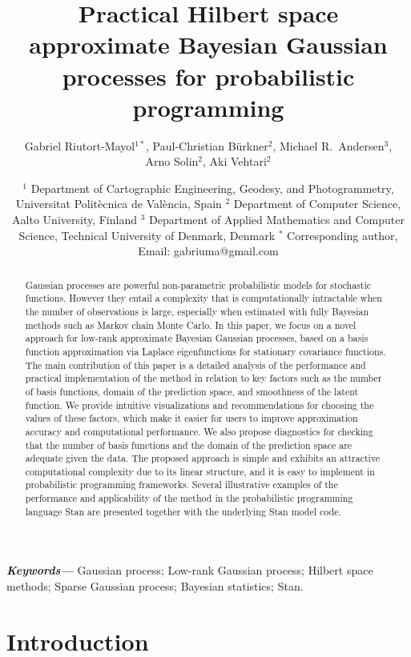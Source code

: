 \documentclass[onecolumn,a4paper,11pt]{article}
\title{Practical Hilbert space approximate Bayesian Gaussian processes for probabilistic programming}
\author{Gabriel Riutort-Mayol$^{1*}$, Paul-Christian Bürkner$^2$, Michael R.\ Andersen$^{3}$,\\
  Arno Solin$^{2}$, Aki Vehtari$^{2}$}
\date{ \small
$^1$ Department of Cartographic Engineering, Geodesy, and Photogrammetry, Universitat Polit\`ecnica de Val\`encia, Spain 
\break
$^2$ Department of Computer Science, Aalto University, Finland
\break
$^3$ Department of Applied Mathematics and Computer Science, Technical University of Denmark, Denmark
\break
$^*$ Corresponding author, Email: gabriuma@gmail.com
}
\providecommand{\keywords}[1]
{
  \small	
  \textbf{\textit{Keywords---}} #1
}
\begin{document}
\maketitle

\begin{abstract}
Gaussian processes are powerful non-parametric probabilistic models for stochastic functions. However they entail a complexity that is computationally intractable when the number of observations is large, especially when estimated with fully Bayesian methods such as Markov chain Monte Carlo. In this paper, we focus on a novel approach for low-rank approximate Bayesian Gaussian processes, based on a basis function approximation via Laplace eigenfunctions for stationary covariance functions. The main contribution of this paper is a detailed analysis of the performance and practical implementation of the method in relation to key factors such as the number of basis functions, domain of the prediction space, and smoothness of the latent function. We provide intuitive visualizations and recommendations for choosing the values of these factors, which make it easier for users to improve approximation accuracy and computational performance. We also propose diagnostics for checking that the number of basis functions and the domain of the prediction space are adequate given the data. The proposed approach is simple and exhibits an attractive computational complexity due to its linear structure, and it is easy to implement in probabilistic programming frameworks. Several illustrative examples of the performance and applicability of the method in the probabilistic programming language Stan are presented together with the underlying Stan model code.
\end{abstract}

\keywords{Gaussian process; Low-rank Gaussian process; Hilbert space methods; Sparse Gaussian process; Bayesian statistics; Stan.}


\section{Introduction}\label{sec_bf_intro}
\end{document}
